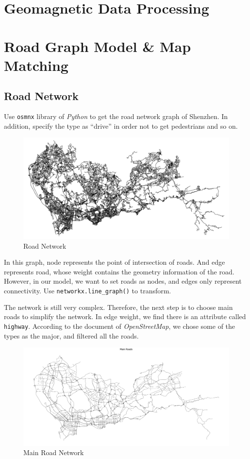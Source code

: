\documentclass[fontset=none]{ctexart}
\theoremstyle{definition}
\theoremstyle{remark}
\begin{document}
\clearpage
\section{Geomagnetic Data Processing}

\clearpage
\section{Road Graph Model \& Map Matching}
\subsection{Road Network}
Use \texttt{osmnx} library of \textit{Python} to get the road network graph of Shenzhen.
In addition, specify the type as ``drive'' in order not to get pedestrians and so on.

\begin{figure}[htb]
  \centering
  \includegraphics[width=\textwidth]{images/7-4-1.png}
  \caption{Road Network}
  \label{fig: rn}
\end{figure}

In this graph, node represents the point of intersection of roads. And edge represents road, whose
weight contains the geometry information of the road. However, in our model, we want to set roads as nodes,
and edges only represent connectivity. Use \texttt{networkx.line\_graph()} to transform.

\clearpage
The network is still very complex. Therefore, the next step is to choose main roads to simplify the network.
In edge weight, we find there is an attribute called \texttt{highway}. According to the document of \textit{OpenStreetMap},
we chose some of the types as the major, and filtered all the roads.

\begin{figure}[htb]
  \centering
  \includegraphics[width=\textwidth]{images/7-4-2.png}
  \caption{Main Road Network}
  \label{fig: mrn}
\end{figure}
\end{document}
